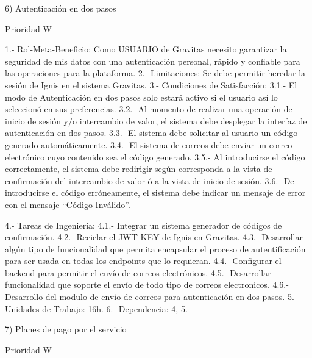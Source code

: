 6) Autenticación en dos pasos

	Prioridad W

	1.-	Rol-Meta-Beneficio: Como USUARIO de Gravitas necesito garantizar la seguridad de mis datos con una autenticación personal, rápido y confiable para las operaciones  para la plataforma.
	2.-	Limitaciones: Se debe permitir heredar la sesión de Ignis en el sistema Gravitas.
	3.-	Condiciones de Satisfacción:
		3.1.- El modo de Autenticación en dos pasos solo estará activo si el usuario así lo seleccionó en sus preferencias.
		3.2.- Al momento de realizar una operación de inicio de sesión y/o intercambio de valor, el sistema debe desplegar la interfaz de autenticación en dos pasos.
		3.3.-	El sistema debe solicitar al usuario un código generado automáticamente.
		3.4.-	El sistema de correos debe enviar un correo electrónico cuyo contenido sea el código generado.
		3.5.-	Al introducirse el código correctamente, el sistema debe redirigir según corresponda a la vista de confirmación del intercambio de valor ó  a la vista de inicio de sesión.
		3.6.-	De introducirse el código erróneamente, el sistema debe indicar un mensaje de error con el mensaje “Código Inválido”.

	4.-	Tareas de Ingeniería:
		4.1.- Integrar un sistema generador de códigos de confirmación.
		4.2.-	Reciclar el JWT KEY de Ignis en Gravitas.
		4.3.-	Desarrollar algún tipo de funcionalidad que permita encapsular el proceso de autentificación para ser usada en todas los endpoints que lo requieran.
		4.4.-	Configurar el backend para permitir el envío de correos electrónicos.
		4.5.-	Desarrollar funcionalidad que soporte el envío de todo tipo de correos electronicos.
		4.6.-	Desarrollo del modulo de envío de correos para autenticación en dos pasos.
	5.-	Unidades de Trabajo: 16h.
	6.- 	Dependencia: 4, 5.


7) Planes de pago por el servicio

	Prioridad W

